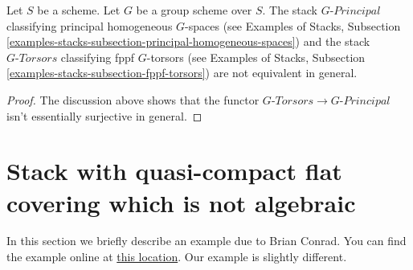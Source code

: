 \begin{lemma}
\label{lemma-torsors-principal-spaces-not-equal}
Let $S$ be a scheme. Let $G$ be a group scheme over $S$.
The stack $G\textit{-Principal}$ classifying principal homogeneous $G$-spaces
(see Examples of Stacks, Subsection
\ref{examples-stacks-subsection-principal-homogeneous-spaces})
and the stack $G\textit{-Torsors}$ classifying fppf $G$-torsors
(see Examples of Stacks, Subsection
\ref{examples-stacks-subsection-fppf-torsors})
are not equivalent in general.
\end{lemma}

\begin{proof}
The discussion above shows that the functor
$G\textit{-Torsors} \to G\textit{-Principal}$ isn't essentially
surjective in general.
\end{proof}









\section{Stack with quasi-compact flat covering which is not algebraic}
\label{section-not-algebraic-stack}

\noindent
In this section we briefly describe an example due to Brian Conrad.
You can find the example online at
\href{https://mathoverflow.net/questions/15082/fpqc-covers-of-stacks/15269#15269}{this location}.
Our example is slightly different.


